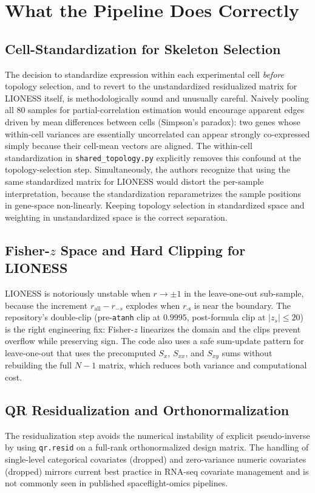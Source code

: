 \documentclass[11pt]{article}
\newcommand{\code}[1]{\texttt{#1}}
\begin{document}
\section{What the Pipeline Does Correctly}

\subsection{Cell-Standardization for Skeleton Selection}
The decision to standardize expression within each experimental cell \emph{before} topology selection, and to revert to the unstandardized residualized matrix for LIONESS itself, is methodologically sound and unusually careful. Naively pooling all 80 samples for partial-correlation estimation would encourage apparent edges driven by mean differences between cells (Simpson's paradox): two genes whose within-cell variances are essentially uncorrelated can appear strongly co-expressed simply because their cell-mean vectors are aligned. The within-cell standardization in \code{shared\_topology.py} explicitly removes this confound at the topology-selection step. Simultaneously, the authors recognize that using the same standardized matrix for LIONESS would distort the per-sample interpretation, because the standardization reparametrizes the sample positions in gene-space non-linearly. Keeping topology selection in standardized space and weighting in unstandardized space is the correct separation.

\subsection{Fisher-$z$ Space and Hard Clipping for LIONESS}
LIONESS is notoriously unstable when $r \to \pm 1$ in the leave-one-out sub-sample, because the increment $r_{\text{all}} - r_{-s}$ explodes when $r_{\text{-s}}$ is near the boundary. The repository's double-clip (pre-\code{atanh} clip at $0.9995$, post-formula clip at $|z_s| \leq 20$) is the right engineering fix: Fisher-$z$ linearizes the domain and the clips prevent overflow while preserving sign. The code also uses a safe sum-update pattern for leave-one-out that uses the precomputed $S_x$, $S_{xx}$, and $S_{xy}$ sums without rebuilding the full $N{-}1$ matrix, which reduces both variance and computational cost.

\subsection{QR Residualization and Orthonormalization}
The residualization step avoids the numerical instability of explicit pseudo-inverse by using \code{qr.resid} on a full-rank orthonormalized design matrix. The handling of single-level categorical covariates (dropped) and zero-variance numeric covariates (dropped) mirrors current best practice in RNA-seq covariate management and is not commonly seen in published spaceflight-omics pipelines.
\end{document}
